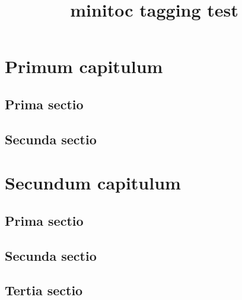 \documentclass{report}
\title{minitoc tagging test}
\begin{document}
\dominitoc
\tableofcontents
\chapter{Primum capitulum}
\minitoc
\section{Prima sectio}
\kant[1-2]
\section{Secunda sectio}
\kant[3-4]
\chapter{Secundum capitulum}
\minitoc
\section{Prima sectio}
\kant[5-6]
\section{Secunda sectio}
\kant[7-8]
\section{Tertia sectio}
\kant[9-10]
\end{document}
